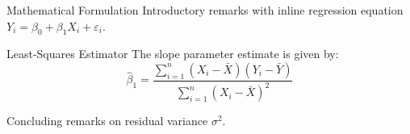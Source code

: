 \documentclass[14pt,t]{beamer-accessibility}
\begin{document}
\begin{frame}{Mathematical Formulation}
Introductory remarks with inline regression equation $Y_i = \beta_0 + \beta_1 X_i + \varepsilon_i$.

\begin{block}{Least-Squares Estimator}
The slope parameter estimate is given by:
\[
\hat{\beta}_1 = \frac{\sum_{i=1}^n (X_i - \bar{X})(Y_i - \bar{Y})}{\sum_{i=1}^n (X_i - \bar{X})^2}
\]
\end{block}

Concluding remarks on residual variance $\sigma^2$.
\end{frame}
\end{document}

